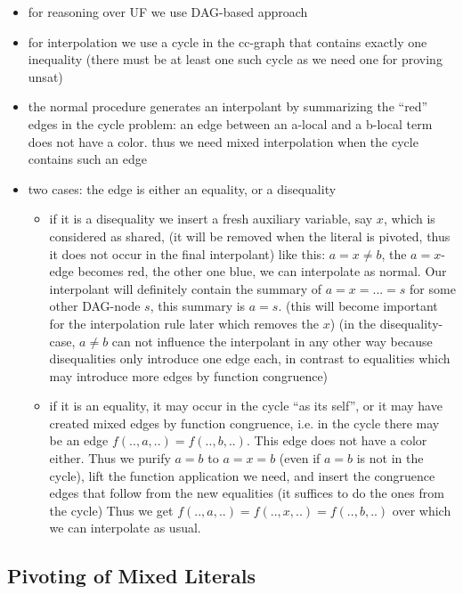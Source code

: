 \documentclass{llncs}
\begin{document}
\begin{itemize}
 \item for reasoning over UF we use DAG-based approach
 \item  for interpolation we use a cycle in the cc-graph that contains exactly one 
 inequality
 (there must be at least one such cycle as we need one for proving unsat)
 \item  the normal procedure generates an interpolant by summarizing the ``red'' edges
 in the cycle
  problem: an edge between an a-local and a b-local term does not have a color.
   thus we need mixed interpolation when the cycle contains such an edge 
 \item  two cases: the edge is either an equality, or a disequality
 \begin{itemize}
  \item if it is a disequality we insert a fresh auxiliary variable, say $x$, which is 
  considered as shared, (it will be removed when the literal is pivoted, thus it does
  not occur in the final interpolant) like this:
  $a=x\neq b$, the $a=x$-edge becomes red, the other one blue, we can interpolate as 
  normal. 
  Our interpolant will definitely contain the summary of $a=x=...=s$ for some other 
  DAG-node $s$, this summary is $a=s$. (this will become important for the 
  interpolation rule later which removes the $x$)
  (in the disequality-case, $a\neq b$ can not influence the interpolant in any other 
  way because disequalities only introduce one edge each, in contrast to equalities 
  which may introduce more edges by function congruence)
  \item if it is an equality, it may occur in the cycle ``as its self'', or it may have
  created mixed edges by function congruence, i.e. in the cycle there may be an edge
  $f(..,a,..)=f(..,b,..)$. This edge does not have a color either. Thus we purify
  $a=b$ to $a=x=b$ (even if $a=b$ is not in the cycle), lift the function application we 
  need, and insert the congruence edges that follow from the new equalities (it suffices to
  do the ones from the cycle)
  Thus we get $f(..,a,..)=f(..,x,..)=f(..,b,..)$ over which we can interpolate as usual.
 \end{itemize}
\end{itemize}
  
  
\subsection{Pivoting of Mixed Literals}
\end{document}
